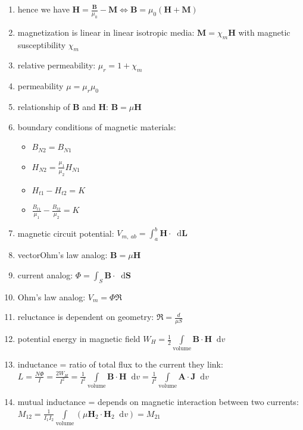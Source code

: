 \documentclass[a4paper,11pt]{article}
\newcommand*\dd{\mathop{}\!\mathrm{d}}
\newcommand{\bvec}[1]{\mathbf{#1}}
\begin{document}
\begin{enumerate}
		\item hence we have $\bvec{H} = \frac{\bvec{B}}{\mu_0} - \bvec{M} \Longleftrightarrow \bvec{B} = \mu_0\left (\bvec{H} + \bvec{M} \right)$
		\item magnetization is linear in linear isotropic media: $\bvec{M} = \chi_m\bvec{H}$ with magnetic susceptibility $\chi_m$
		\item relative permeability: $\mu_r = 1 + \chi_m$
		\item permeability $\mu = \mu_r\mu_0$
		\item relationship of $\bvec{B}$ and $\bvec{H}$: $\bvec{B} = \mu\bvec{H}$ 
		\item boundary conditions of magnetic materials: 
			\begin{itemize}
				\item $B_{N2} = B_{N1}$
				\item $H_{N2} = \frac{\mu_1}{\mu_2}H_{N1}$
				\item $H_{t1} - H_{t2} = K$
				\item $\frac{B_{t1}}{\mu_1} - \frac{B_{t2}}{\mu_2} = K$
			\end{itemize}
		\item magnetic circuit potential: $V_{m,~ab} = \int_a^b \bvec{H}\cdot\dd\bvec{L}$
		\item vectorOhm's law analog: $\bvec{B} = \mu\bvec{H}$
		\item current analog: $\Phi = \int_S \bvec{B}\cdot\dd\bvec{S}$
		\item Ohm's law analog: $V_m = \Phi\mathfrak{R}$
		\item reluctance is dependent on geometry: $\mathfrak{R} = \frac{d}{\mu S}$
		\item potential energy in magnetic field $W_H = \frac{1}{2}\int\limits_\text{volume} \bvec{B} \cdot\bvec{H}\dd v$
		\item inductance = ratio of total flux to the current they link: $L = \frac{N\Phi}{I} = \frac{2W_H}{I^2} = \frac{1}{I^2}\int\limits_\text{volume} \bvec{B}\cdot\bvec{H}\dd v = \frac{1}{I^2}\int\limits_\text{volume} \bvec{A}\cdot\bvec{J}\dd v$
		\item mutual inductance = depends on magnetic interaction between two currents: $M_{12} = \frac{1}{I_1I_2} \int\limits_\text{volume} (\mu\bvec{H}_2\cdot\bvec{H}_2 \dd v) = M_{21}$ 
	\end{enumerate}
\end{document}
